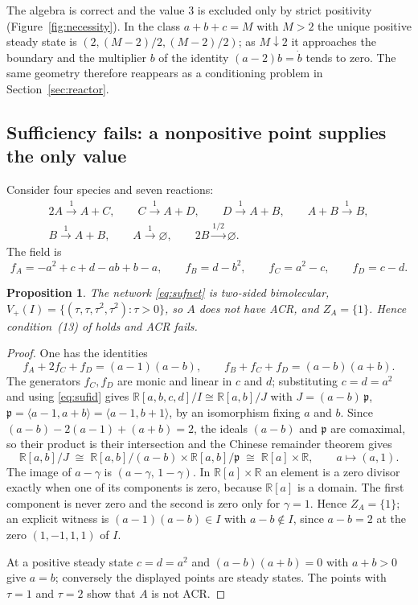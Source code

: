 \documentclass[11pt,a4paper]{article}
\theoremstyle{plain}
\newtheorem{proposition}[theorem]{Proposition}
\theoremstyle{definition}
\theoremstyle{remark}
\newcommand{\R}{\mathbb{R}}
\begin{document}
The algebra is correct and the value $3$ is excluded only by strict positivity (Figure~\ref{fig:necessity}). In the class $a+b+c=M$ with $M>2$ the unique positive steady state is $(2,(M-2)/2,(M-2)/2)$; as $M\downarrow2$ it approaches the boundary and the multiplier $b$ of the identity $(a-2)b=\dot b$ tends to zero. The same geometry therefore reappears as a conditioning problem in Section~\ref{sec:reactor}.

\subsection{Sufficiency fails: a nonpositive point supplies the only value}

Consider four species and seven reactions:
\begin{equation}\label{eq:sufnet}
\begin{gathered}
2A\xrightarrow{1}A+C,\qquad C\xrightarrow{1}A+D,\qquad D\xrightarrow{1}A+B,\qquad A+B\xrightarrow{1}B,\\
B\xrightarrow{1}A+B,\qquad A\xrightarrow{1}\varnothing,\qquad 2B\xrightarrow{1/2}\varnothing.
\end{gathered}
\end{equation}
The field is
\begin{equation}\label{eq:suffield}
f_A=-a^2+c+d-ab+b-a,\qquad f_B=d-b^2,\qquad f_C=a^2-c,\qquad f_D=c-d.
\end{equation}

\begin{proposition}\label{prop:sufficiency}
The network \eqref{eq:sufnet} is two-sided bimolecular, $V_+(I)=\{(\tau,\tau,\tau^2,\tau^2):\tau>0\}$, so $A$ does not have ACR, and $Z_A=\{1\}$. Hence condition~(13) of \cite{acr} holds and ACR fails.
\end{proposition}
\begin{proof}
One has the identities
\begin{equation}\label{eq:sufid}
  f_A+2f_C+f_D=(a-1)(a-b),\qquad f_B+f_C+f_D=(a-b)(a+b).
\end{equation}
The generators $f_C,f_D$ are monic and linear in $c$ and $d$; substituting $c=d=a^2$ and using \eqref{eq:sufid} gives $\R[a,b,c,d]/I\cong\R[a,b]/J$ with $J=(a-b)\,\mathfrak p$, $\mathfrak p=\langle a-1,a+b\rangle=\langle a-1,b+1\rangle$, by an isomorphism fixing $a$ and $b$. Since $(a-b)-2(a-1)+(a+b)=2$, the ideals $(a-b)$ and $\mathfrak p$ are comaximal, so their product is their intersection and the Chinese remainder theorem gives
\[
  \R[a,b]/J\;\cong\;\R[a,b]/(a-b)\times\R[a,b]/\mathfrak p\;\cong\;\R[a]\times\R,\qquad a\longmapsto(a,1).
\]
The image of $a-\gamma$ is $(a-\gamma,\,1-\gamma)$. In $\R[a]\times\R$ an element is a zero divisor exactly when one of its components is zero, because $\R[a]$ is a domain. The first component is never zero and the second is zero only for $\gamma=1$. Hence $Z_A=\{1\}$; an explicit witness is $(a-1)(a-b)\in I$ with $a-b\notin I$, since $a-b=2$ at the zero $(1,-1,1,1)$ of $I$.

At a positive steady state $c=d=a^2$ and $(a-b)(a+b)=0$ with $a+b>0$ give $a=b$; conversely the displayed points are steady states. The points with $\tau=1$ and $\tau=2$ show that $A$ is not ACR.
\end{proof}
\end{document}
